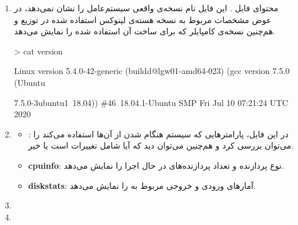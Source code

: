 \newpage


\begin{enumerate}
	\item محتوای فایل . 
	این فایل نام نسخه‌ی واقعی سیستم‌عامل را نشان نمی‌دهد، در عوض مشخصات مربوط به نسخه هسته‌ی لینوکس استفاده شده در توزیع و هم‌چنین نسخه‌ی کامپایلر  که برای ساخت آن استفاده شده را نمایش می‌دهد.
	
	\begin{code}
		> cat version
		
		Linux version 5.4.0-42-generic (buildd@lgw01-amd64-023) (gcc version 7.5.0 		(Ubuntu
		
		 7.5.0-3ubuntu1~18.04)) \#46~18.04.1-Ubuntu SMP Fri Jul 10 07:21:24 UTC 2020
	\end{code}


	\item 
	
	
	\begin{itemize}
		\item \textbf{}: در این فایل، پارامترهایی که سیستم هنگام  شدن از آن‌ها استفاده می‌کند را می‌توان بررسی کرد و هم‌چنین می‌توان دید که آیا شامل تغییرات است یا خیر.
		
		\item \textbf{cpuinfo}: نوع پردازنده و تعداد پردازنده‌های در حال اجرا را نمایش می‌دهد. 
		
		\item \textbf{diskstats}: آمارهای ورودی و خروجی مربوط به  را نمایش می‌دهد.		
	\end{itemize}

	\item
	
	\item
\end{enumerate}

